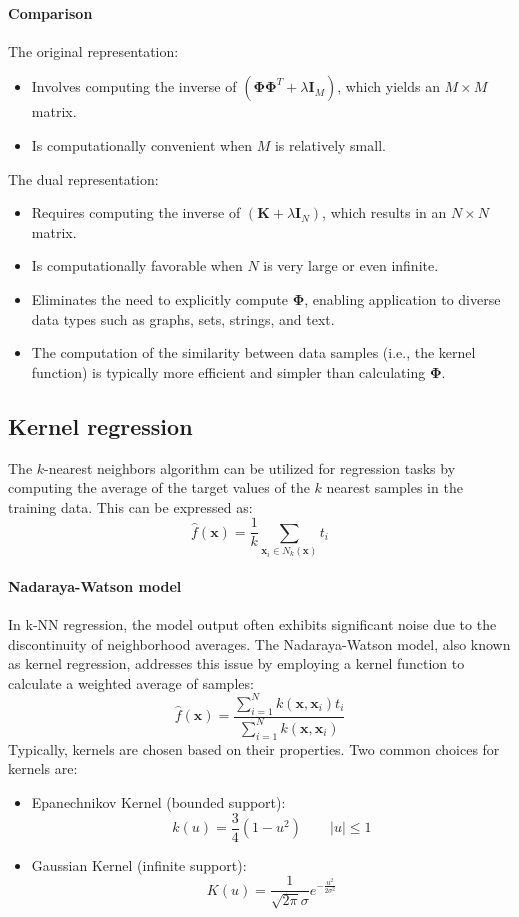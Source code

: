 \paragraph*{Comparison}
The original representation:
\begin{itemize}
    \item Involves computing the inverse of $(\boldsymbol{\Phi}\boldsymbol{\Phi}^T+\lambda\textbf{I}_M)$, which yields an  $M \times M$ matrix.
    \item Is computationally convenient when $M$ is relatively small.
\end{itemize}
The dual representation: 
\begin{itemize}
    \item Requires computing the inverse of $(\textbf{K}+\lambda\textbf{I}_N)$, which results in an $N \times N$ matrix.
    \item Is computationally favorable when $N$ is very large or even infinite.
    \item Eliminates the need to explicitly compute $\boldsymbol{\Phi}$, enabling application to diverse data types such as graphs, sets, strings, and text.
    \item The computation of the similarity between data samples (i.e., the kernel function) is typically more efficient and simpler than calculating $\boldsymbol{\Phi}$.
\end{itemize}

\subsection{Kernel regression}
The $k$-nearest neighbors algorithm can be utilized for regression tasks by computing the average of the target values of the $k$ nearest samples in the training data. 
This can be expressed as:
\[\hat{f}(\textbf{x})=\dfrac{1}{k}\sum_{\textbf{x}_i\in N_k(\textbf{x})}t_i\]

\paragraph*{Nadaraya-Watson model}
In k-NN regression, the model output often exhibits significant noise due to the discontinuity of neighborhood averages. 
The Nadaraya-Watson model, also known as kernel regression, addresses this issue by employing a kernel function to calculate a weighted average of samples:
\[\hat{f}(\textbf{x})=\dfrac{\sum_{i=1}^N k(\textbf{x},\textbf{x}_i)t_i}{\sum_{i=1}^N k(\textbf{x},\textbf{x}_i)}\]
Typically, kernels are chosen based on their properties. Two common choices for kernels are:
\begin{itemize}
    \item Epanechnikov Kernel (bounded support):
        \[k(u)=\dfrac{3}{4}{\left(1-u^2\right)} \qquad \left\lvert u \right\rvert \leq 1\]
    \item Gaussian Kernel (infinite support):
        \[K(u)=\dfrac{1}{\sqrt{2\pi}\sigma}e^{-\frac{u^2}{2\sigma^2}}\]
\end{itemize}

